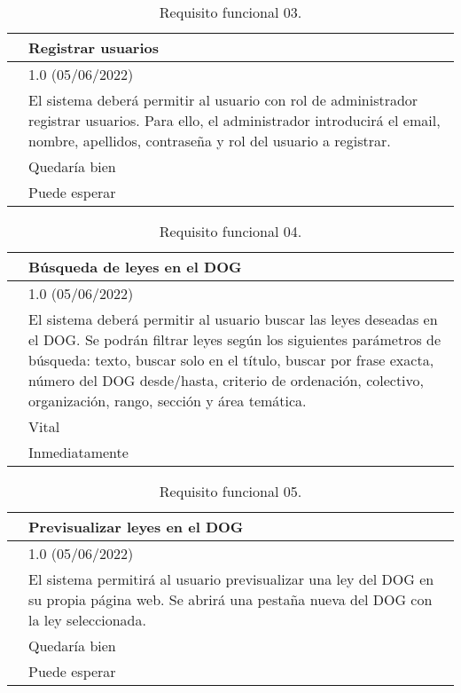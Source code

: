 \begin{table}[H]
\begin{center}
\begin{tabular}{|p{3cm}|p{10cm}|} \hline
\centering {\bf FRQ-03} & Registrar usuarios  \\ \hline\hline
\centering {\bf Versión} & 1.0 (05/06/2022) \\ \hline
\centering {\bf Descripción} & El sistema deberá permitir al usuario con rol de administrador registrar usuarios. Para ello, el administrador introducirá el email, nombre, apellidos, contraseña y rol del usuario a registrar. \\ \hline
\centering {\bf Importancia} & Quedaría bien \\ \hline
\centering {\bf Urgencia} & Puede esperar \\ \hline
\end{tabular}
\caption{Requisito funcional 03.}
\label{enlaceFRQ3}
\end{center}
\end{table}

\begin{table}[H]
\begin{center}
\begin{tabular}{|p{3cm}|p{10cm}|} \hline
\centering {\bf FRQ-04} & Búsqueda de leyes en el DOG  \\ \hline\hline
\centering {\bf Versión} & 1.0 (05/06/2022) \\ \hline
\centering {\bf Descripción} & El sistema deberá permitir al usuario buscar las leyes deseadas en el DOG. Se podrán filtrar leyes según los siguientes parámetros de búsqueda: texto, buscar solo en el título, buscar por frase exacta, número del DOG desde/hasta, criterio de ordenación, colectivo, organización, rango, sección y área temática. \\ \hline
\centering {\bf Importancia} & Vital \\ \hline
\centering {\bf Urgencia} & Inmediatamente \\ \hline
\end{tabular}
\caption{Requisito funcional 04.}
\label{enlaceFRQ4}
\end{center}
\end{table}

\begin{table}[H]
\begin{center}
\begin{tabular}{|p{3cm}|p{10cm}|} \hline
\centering {\bf FRQ-05} & Previsualizar leyes en el DOG  \\ \hline\hline
\centering {\bf Versión} & 1.0 (05/06/2022) \\ \hline
\centering {\bf Descripción} & El sistema permitirá al usuario previsualizar una ley del DOG en su propia página web. Se abrirá una pestaña nueva del DOG con la ley seleccionada. \\ \hline
\centering {\bf Importancia} & Quedaría bien \\ \hline
\centering {\bf Urgencia} & Puede esperar \\ \hline
\end{tabular}
\caption{Requisito funcional 05.}
\label{enlaceFRQ5}
\end{center}
\end{table}

